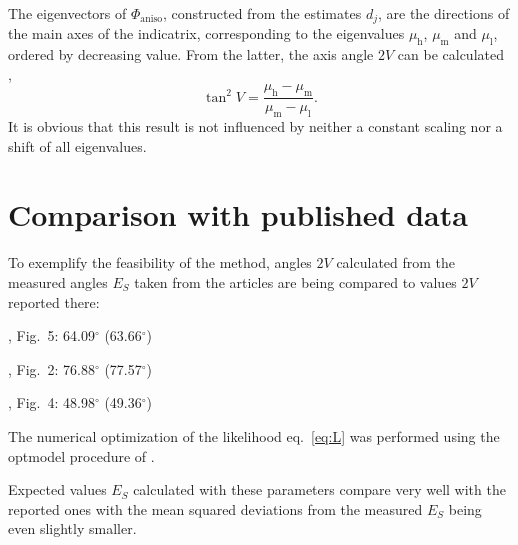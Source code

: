 \documentclass{article}
\begin{document}
The eigenvectors of $\Phi_\mathrm{aniso}$, constructed from the estimates $d_j$,  are the directions of the main axes of the indicatrix, 
corresponding to the eigenvalues $\mu_\mathrm{h}$, $\mu_\mathrm{m}$ and $\mu_\mathrm{l}$, ordered by decreasing value. 
From the latter, the axis angle $2V$ can be calculated \cite{garaycochea1964determination},
\[
	\tan^2{V}=\frac{\mu_\mathrm{h}-\mu_\mathrm{m}}{\mu_\mathrm{m}-\mu_\mathrm{l}}.
\]
It is obvious that this result is not influenced by neither a  constant scaling nor a shift of all eigenvalues. 

\section{Comparison with published data}

To exemplify the feasibility of the method, angles $2V$ calculated from the measured angles $E_S$ taken from  the  articles \cite{bloss1973computer, bartelmehs1992excalibr, gunter2004results}
are being compared to values $2V$ reported there: 

\cite{bloss1973computer}, Fig.\ 5: 64.09$^\circ$ (63.66$^\circ$)

\cite{bartelmehs1992excalibr}, Fig.\ 2: 76.88$^\circ$ (77.57$^\circ$)

\cite {gunter2004results}, Fig.\ 4:   48.98$^\circ$ (49.36$^\circ$)

The numerical optimization of the likelihood eq.\ \ref{eq:L} was performed using the optmodel procedure of  \cite{SAS}.  

Expected values $E_S$ calculated with these parameters compare very well with the reported ones with the mean squared deviations from the measured $E_S$ being even slightly smaller. 


{}

\end{document}
